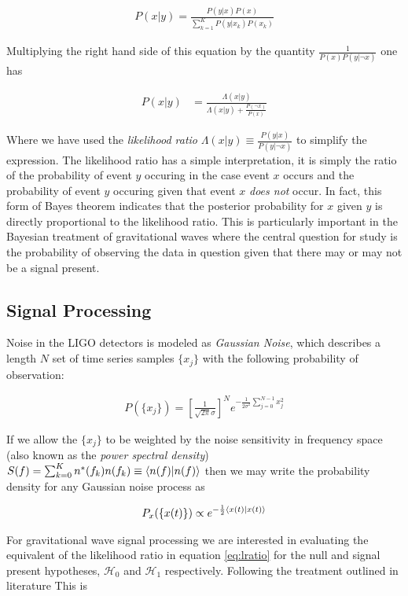 \begin{align}
P(x|y) = \frac{P(y|x) P(x)}{\sum_{k=1}^K P(y|x_k)P(x_k)}
\end{align}

Multiplying the right hand side of this equation by the quantity $\frac{1}{P(x)P(y|\neg x)}$ one has 

\begin{align} \label{eq:lratio}
P(x|y) &= \frac{\Lambda(x|y)}{\Lambda(x|y) + \frac{P(\neg x)}{P(x)}}
\end{align}

Where we have used the \textit{likelihood ratio} $\Lambda(x|y) \equiv \frac{P(y|x)}{P(y|\neg x)}$ to simplify the expression. The likelihood ratio has a simple interpretation, it is simply the ratio of the probability of event $y$ occuring in the case event $x$ occurs and the probability of event $y$ occuring given that event $x$ \textit{does not} occur. In fact, this form of Bayes theorem indicates that the posterior probability for $x$ given $y$ is directly proportional to the likelihood ratio. This is particularly important in the Bayesian treatment of gravitational waves where the central question for study is the probability of observing the data in question given that there may or may not be a signal present.  

\subsection{Signal Processing}
Noise in the LIGO detectors is modeled as \textit{Gaussian Noise}, which describes a length $N$ set of time series samples $\{x_j\}$ with the following probability of observation:

\begin{align}
P(\{x_j\}) = \left[\frac{1}{\sqrt{2 \pi} \sigma}\right]^N e^{-\frac{1}{2 \sigma^2} \sum_{j = 0}^{N - 1}x_j^2}
\end{align}

If we allow the $\{x_j\}$ to be weighted by the noise sensitivity in frequency space (also known as the \textit{power spectral density}) $S(f) = \sum_{k=0}^K n^*(f_k)n(f_k) \equiv \braket{n(f)|n(f)}$ then we may write the probability density for any Gaussian noise process as 

\begin{align}
P_x(\{x(t)\}) \propto e^{-\frac{1}{2}\braket{x(t)|x(t)}}
\end{align}

For gravitational wave signal processing we are interested in evaluating the equivalent of the likelihood ratio  in equation \ref{eq:lratio} for the null and signal present hypotheses, $\mathcal{H}_0$ and $\mathcal{H}_1$ respectively. Following the treatment outlined in literature \cite{rapidpe} This is

